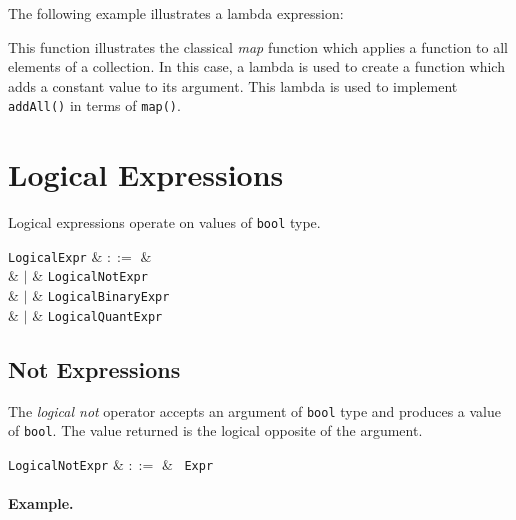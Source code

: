 The following example illustrates a lambda expression:



This function illustrates the classical {\em map} function which applies a function to all elements of a collection.  In this case, a lambda is used to create a function which adds a constant value to its argument.  This lambda is used to implement \lstinline{addAll()} in terms of \lstinline{map()}.


\section{Logical Expressions}
\label{c_expr_logical}

Logical expressions operate on values of \lstinline{bool} type.

\begin{syntax}
  \verb+LogicalExpr+ & $::=$ &\\
  & $|$ & \verb+LogicalNotExpr+\\
  & $|$ & \verb+LogicalBinaryExpr+\\
  & $|$ & \verb+LogicalQuantExpr+\\
\end{syntax}



\subsection{Not Expressions}
\label{c_expr_logical_not}

The {\em logical not} operator accepts an argument of \lstinline{bool} type and produces a value of \lstinline{bool}.  The value returned is the logical opposite of the argument.  

\begin{syntax}
\verb+LogicalNotExpr+ & $::=$ & \token{!}\ \verb+Expr+\\
\end{syntax}

\paragraph{Example.}

